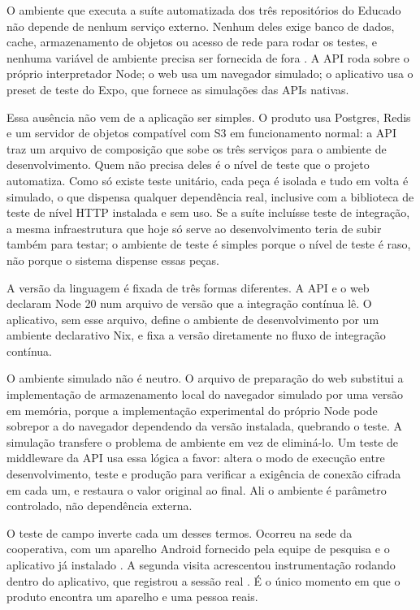 O ambiente que executa a suíte automatizada dos três repositórios do Educado não
depende de nenhum serviço externo. Nenhum deles exige banco de dados, cache,
armazenamento de objetos ou acesso de rede para rodar os testes, e nenhuma
variável de ambiente precisa ser fornecida de fora \cite{educado-repos}. A API
roda sobre o próprio interpretador Node; o web usa um navegador simulado; o
aplicativo usa o preset de teste do Expo, que fornece as simulações das APIs
nativas.

Essa ausência não vem de a aplicação ser simples. O produto usa Postgres, Redis e
um servidor de objetos compatível com S3 em funcionamento normal: a API traz um
arquivo de composição que sobe os três serviços para o ambiente de
desenvolvimento. Quem não precisa deles é o nível de teste que o projeto
automatiza. Como só existe teste unitário, cada peça é isolada e tudo em volta é
simulado, o que dispensa qualquer dependência real, inclusive com a biblioteca de
teste de nível HTTP instalada e sem uso. Se a suíte incluísse teste de
integração, a mesma infraestrutura que hoje só serve ao desenvolvimento teria de
subir também para testar; o ambiente de teste é simples porque o nível de teste é
raso, não porque o sistema dispense essas peças.

A versão da linguagem é fixada de três formas diferentes. A API e o web declaram
Node 20 num arquivo de versão que a integração contínua lê. O aplicativo, sem
esse arquivo, define o ambiente de desenvolvimento por um ambiente declarativo
Nix, e fixa a versão diretamente no fluxo de integração contínua.

O ambiente simulado não é neutro. O arquivo de preparação do web substitui a
implementação de armazenamento local do navegador simulado por uma versão em
memória, porque a implementação experimental do próprio Node pode sobrepor a do
navegador dependendo da versão instalada, quebrando o teste. A simulação
transfere o problema de ambiente em vez de eliminá-lo. Um teste de middleware da
API usa essa lógica a favor: altera o modo de execução entre desenvolvimento,
teste e produção para verificar a exigência de conexão cifrada em cada um, e
restaura o valor original ao final. Ali o ambiente é parâmetro controlado, não
dependência externa.

O teste de campo inverte cada um desses termos. Ocorreu na sede da cooperativa,
com um aparelho Android fornecido pela equipe de pesquisa e o aplicativo já
instalado \cite[p.~16]{psp5}. A segunda visita acrescentou instrumentação rodando
dentro do aplicativo, que registrou a sessão real \cite{dashboard}. É o único
momento em que o produto encontra um aparelho e uma pessoa reais.

